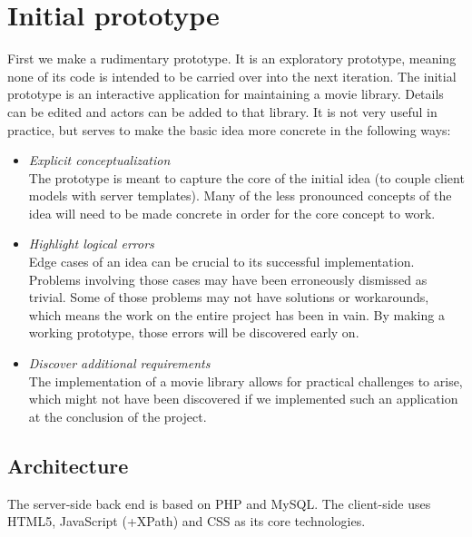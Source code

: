 \chapter{Initial prototype}
First we make a rudimentary prototype. It is an exploratory prototype,
meaning none of its code is intended to be carried over into the next iteration.
The initial prototype is an interactive application for maintaining a movie
library. Details can be edited and actors can be added to that library.
It is not very useful in practice, but serves to make the basic idea more
concrete in the following ways:

\begin{itemize}
	\label{list:prototype-motivation}
	\item \emph{Explicit conceptualization}\\
	The prototype is meant to capture the core of the initial idea (to couple
	client models with server templates).
	Many of the less pronounced concepts of the idea will need to be made concrete
	in order for the core concept to work.
	\item \emph{Highlight logical errors}\\
	Edge cases of an idea can be crucial to its successful implementation.
	Problems involving those cases may have been erroneously dismissed as trivial.
	Some of those problems may not have solutions or workarounds, which
	means the work on the entire project has been in vain. By making a working
	prototype, those errors will be discovered early on.
	\item \emph{Discover additional requirements}\\
	The implementation of a movie library allows for practical challenges to
	arise, which might not have been discovered if we implemented such an
	application at the conclusion of the project.
\end{itemize}

\section{Architecture}

The server-side back end is based on PHP and MySQL. The client-side uses
HTML5, JavaScript (+XPath) and CSS as its core technologies.

